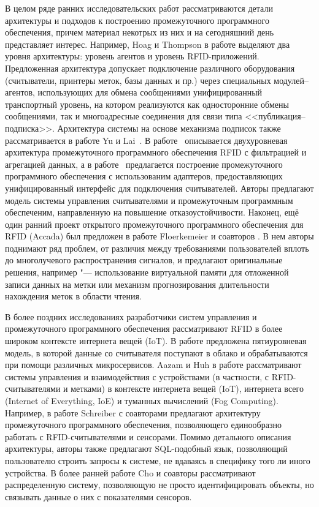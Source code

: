 В целом ряде ранних исследовательских работ \cite{Hoag2006,Yu2009,XiuLi2012,Koutsoubelias2007,Abad2012,Chien-ChangHsu2008,Floerkemeier2007} рассматриваются детали архитектуры и подходов к построению промежуточного программного обеспечения, причем материал некотрых из них и на сегодняшний день представляет интерес. Например, Hoag и Thompson в работе \cite{Hoag2006} выделяют два уровня архитектуры: уровень агентов и уровень RFID-приложений. Предложенная архитектура допускает подключение различного оборудования (считыватели, принтеры меток, базы данных и пр.) через специальных модулей--агентов, использующих для обмена сообщениями унифицированный транспортный уровень, на котором реализуются как односторонние обмены сообщениями, так и многоадресные соединения для связи типа <<публикация--подписка>>. Архитектура системы на основе механизма подписок также рассматривается в работе Yu и Lai~\cite{Yu2009}. В работе~\cite{XiuLi2012} описывается двухуровневая архитектура промежуточного программного обеспечения RFID с фильтрацией и агрегацией данных, а в работе~\cite{Koutsoubelias2007} предлагается построение промежуточного программного обеспечения с использованим адаптеров, предоставляющих унифицированный интерфейс для подключения считывателей. Авторы \cite{Chien-ChangHsu2008} предлагают модель системы управления считывателями и промежуточным программным обеспеченим, направленную на повышение отказоустойчивости. Наконец, ещё один ранний проект открытого промежуточного программного обеспечения для RFID (Accada) был предложен в работе Floerkemeier и соавторов \cite{Floerkemeier2007}. В нем авторы поднимают ряд проблем, от различия между требованиями пользователей вплоть до многолучевого распространения сигналов, и предлагают оригинальные решения, например "--- использование виртуальной памяти для отложенной записи данных на метки или механизм прогнозирования длительности нахождения меток в области чтения.

В более поздних исследованиях разработчики систем управления и промежуточного программного обеспечения рассматривают RFID в более широком контексте интернета вещей (IoT). В работе \cite{Santos2019} предложена пятиуровневая модель, в которой данные со считывателя поступают в облако и обрабатываются при помощи различных микросервисов. Aazam и Huh в работе \cite{Aazam2016} рассматривают системы управления и взаимодействия с устройствами (в частности, с RFID-считывателями и метками) в контексте интернета вещей (IoT), интернета всего (Internet of Everything, IoE) и туманных вычислений (Fog Computing). Например, в работе \cite{Schreiber2012} Schreiber с соавторами предлагают архитектуру промежуточного программного обеспечения, позволяющего единообразно работать с RFID-считывателями и сенсорами. Помимо детального описания архитектуры, авторы также предлагают SQL-подобный язык, позволяющий пользователю строить запросы к системе, не вдаваясь в специфику того ли иного устройства. В более ранней работе \cite{Cho2007} Cho и соавторы рассматривают распределенную систему, позволяющую не просто идентифицировать объекты, но связывать данные о них с показателями сенсоров.

